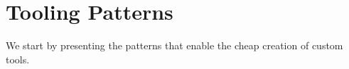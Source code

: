 \documentclass[sigconf,screen]{acmart}
\newcommand\rb[1]{\nbc{Ralf}{#1}{teal}}
\newcommand\wc[1]{\nbc{Ward}{#1}{teal}}
\newcommand\pp[1]{\nbe{Petr}{#1}{cyan}} %
\newcommand\cp[1]{\nbe{Cesare}{#1}{olive}} %
\newcommand\ws[1]{\nbe{Workshop}{#1}{teal}} %
\begin{document}

\section{Tooling Patterns}\label{sec:tooling}

We start by presenting the patterns that enable the cheap creation of custom tools.




\end{document}

